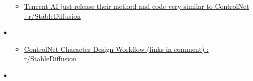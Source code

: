 \begin{itemize}
\begin{itemize}
  \item
    \href{https://www.reddit.com/r/StableDiffusion/comments/1148x38/tencent_ai_just_release_their_method_and_code/}{Tencent
    AI just release their method and code very similar to ControlNet :
    r/StableDiffusion}
  \end{itemize}
\item
  \begin{itemize}
   
  \item
    \href{https://www.reddit.com/r/StableDiffusion/comments/11rfol4/controlnet_character_design_workflow_links_in/}{ControlNet
    Character Design Workflow (links in comment) : r/StableDiffusion}
  \end{itemize}
\item
  \begin{itemize}
   

\end{itemize}
\end{itemize}

